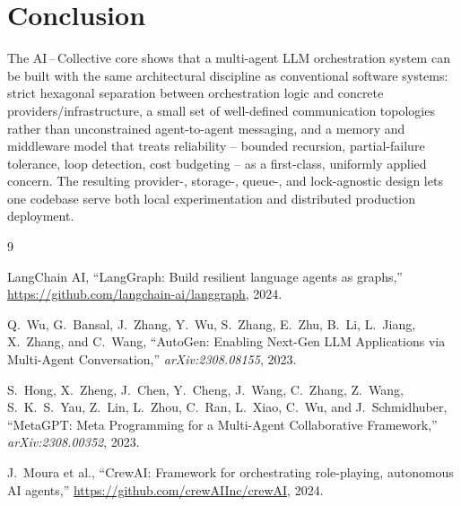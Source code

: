 \documentclass[conference]{IEEEtran}
\begin{document}
\section{Conclusion}
\label{sec:conclusion}

The AI\,--\,Collective core shows that a multi-agent LLM orchestration
system can be built with the same architectural discipline as
conventional software systems: strict hexagonal separation between
orchestration logic and concrete providers/infrastructure, a small set of
well-defined communication topologies rather than unconstrained
agent-to-agent messaging, and a memory and middleware model that treats
reliability -- bounded recursion, partial-failure tolerance, loop
detection, cost budgeting -- as a first-class, uniformly applied concern.
The resulting provider-, storage-, queue-, and lock-agnostic design lets
one codebase serve both local experimentation and distributed production
deployment.

\begin{thebibliography}{9}

LangChain AI, ``LangGraph: Build resilient language agents as graphs,''
\url{https://github.com/langchain-ai/langgraph}, 2024.

Q.~Wu, G.~Bansal, J.~Zhang, Y.~Wu, S.~Zhang, E.~Zhu, B.~Li, L.~Jiang,
X.~Zhang, and C.~Wang, ``AutoGen: Enabling Next-Gen LLM Applications via
Multi-Agent Conversation,'' \emph{arXiv:2308.08155}, 2023.

S.~Hong, X.~Zheng, J.~Chen, Y.~Cheng, J.~Wang, C.~Zhang, Z.~Wang,
S.~K.~S.~Yau, Z.~Lin, L.~Zhou, C.~Ran, L.~Xiao, C.~Wu, and J.~Schmidhuber,
``MetaGPT: Meta Programming for a Multi-Agent Collaborative Framework,''
\emph{arXiv:2308.00352}, 2023.

J.~Moura et al., ``CrewAI: Framework for orchestrating role-playing,
autonomous AI agents,'' \url{https://github.com/crewAIInc/crewAI}, 2024.

\end{thebibliography}
\end{document}
